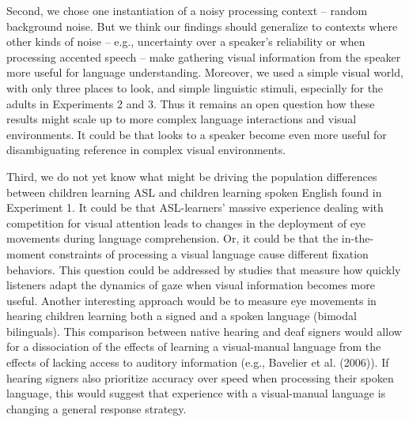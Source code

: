 \documentclass[english,floatsintext,man]{apa6}
\begin{document}
Second, we chose one instantiation of a noisy processing context --
random background noise. But we think our findings should generalize to
contexts where other kinds of noise -- e.g., uncertainty over a
speaker's reliability or when processing accented speech -- make
gathering visual information from the speaker more useful for language
understanding. Moreover, we used a simple visual world, with only three
places to look, and simple linguistic stimuli, especially for the adults
in Experiments 2 and 3. Thus it remains an open question how these
results might scale up to more complex language interactions and visual
environments. It could be that looks to a speaker become even more
useful for disambiguating reference in complex visual environments.

Third, we do not yet know what might be driving the population
differences between children learning ASL and children learning spoken
English found in Experiment 1. It could be that ASL-learners' massive
experience dealing with competition for visual attention leads to
changes in the deployment of eye movements during language
comprehension. Or, it could be that the in-the-moment constraints of
processing a visual language cause different fixation behaviors. This
question could be addressed by studies that measure how quickly
listeners adapt the dynamics of gaze when visual information becomes
more useful. Another interesting approach would be to measure eye
movements in hearing children learning both a signed and a spoken
language (bimodal bilinguals). This comparison between native hearing
and deaf signers would allow for a dissociation of the effects of
learning a visual-manual language from the effects of lacking access to
auditory information (e.g., Bavelier et al. (2006)). If hearing signers
also prioritize accuracy over speed when processing their spoken
language, this would suggest that experience with a visual-manual
language is changing a general response strategy.
\end{document}
